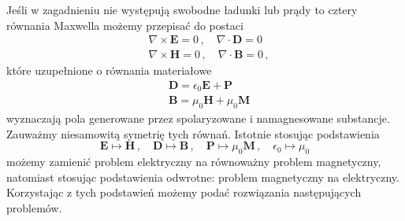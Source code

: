 \documentclass[../main.tex]{subfiles}
\begin{document}
Jeśli w zagadnieniu nie występują swobodne ładunki lub prądy to cztery równania Maxwella możemy
przepisać do postaci
\begin{equation*}
\begin{split}
    &\nabla\times\mathbf{E}=0\,,\quad \nabla\cdot\mathbf{D}=0\\
    &\nabla\times\mathbf{H}=0\,,\quad \nabla\cdot\mathbf{B}=0\,,
\end{split}
\end{equation*}
które uzupełnione o równania materiałowe
\begin{equation*}
    \begin{split}
        &\mathbf{D}=\epsilon_0\mathbf{E}+\mathbf{P}\\
        &\mathbf{B}=\mu_0\mathbf{H}+\mu_0\mathbf{M}
    \end{split}
\end{equation*}
wyznaczają pola generowane przez spolaryzowane i namagnesowane substancje. Zauważmy niesamowitą
symetrię tych równań. Istotnie stosując podstawienia
\begin{equation*}
    \mathbf{E}\mapsto\mathbf{H}\,,\quad\mathbf{D}\mapsto\mathbf{B}\,,\quad \mathbf{P}\mapsto\mu_0\mathbf{M}\,,\quad\epsilon_0\mapsto\mu_0
\end{equation*}
możemy zamienić problem elektryczny na równoważny problem magnetyczny, natomiast stosując
podstawienia odwrotne: problem magnetyczny na elektryczny. Korzystając z tych podstawień możemy
podać rozwiązania następujących problemów.
\end{document}
